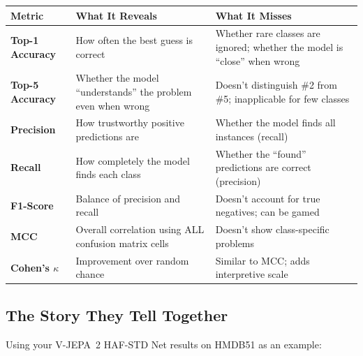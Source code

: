 \documentclass[12pt, a4paper]{article}
\begin{document}
\begin{center}
\renewcommand{\arraystretch}{1.3}
\begin{tabular}{>{\bfseries}p{2.8cm}p{5cm}p{5cm}}
\toprule
\textbf{Metric} & \textbf{What It Reveals} & \textbf{What It Misses} \\
\midrule
Top-1 Accuracy & How often the best guess is correct & Whether rare classes are ignored; whether the model is ``close'' when wrong \\
Top-5 Accuracy & Whether the model ``understands'' the problem even when wrong & Doesn't distinguish \#2 from \#5; inapplicable for few classes \\
Precision & How trustworthy positive predictions are & Whether the model finds all instances (recall) \\
Recall & How completely the model finds each class & Whether the ``found'' predictions are correct (precision) \\
F1-Score & Balance of precision and recall & Doesn't account for true negatives; can be gamed \\
MCC & Overall correlation using ALL confusion matrix cells & Doesn't show class-specific problems \\
Cohen's $\kappa$ & Improvement over random chance & Similar to MCC; adds interpretive scale \\
\bottomrule
\end{tabular}
\end{center}

\subsection{The Story They Tell Together}

Using your V-JEPA~2 HAF-STD Net results on HMDB51 as an example:
\end{document}
